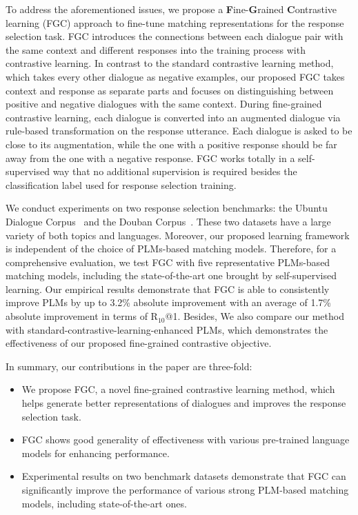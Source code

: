 \documentclass[letterpaper]{article} \usepackage{aaai22}  \usepackage{times}  \usepackage{helvet}  \usepackage{courier}  \usepackage[hyphens]{url}  \usepackage{graphicx} \urlstyle{rm} \def\UrlFont{\rm}  \usepackage{natbib}  \usepackage{caption} \DeclareCaptionStyle{ruled}{labelfont=normalfont,labelsep=colon,strut=off} \frenchspacing  \setlength{\pdfpagewidth}{8.5in}  \setlength{\pdfpageheight}{11in}  \usepackage{algorithm}
\begin{document}
To address the aforementioned issues, we propose a \textbf{F}ine-\textbf{G}rained \textbf{C}ontrastive learning (FGC) approach to fine-tune matching representations for the response selection task. FGC introduces the connections between each dialogue pair with the same context and different responses into the training process with contrastive learning. In contrast to the standard contrastive learning method, which takes every other dialogue as negative examples, our proposed FGC takes context and response as separate parts and focuses on distinguishing between positive and negative dialogues with the same context. During fine-grained contrastive learning, each dialogue is converted into an augmented dialogue via rule-based transformation on the response utterance. Each dialogue is asked to be close to its augmentation, while the one with a positive response should be far away from the one with a negative response. FGC works totally in a self-supervised way that no additional supervision is required besides the classification label used for response selection training.

We conduct experiments on two response selection benchmarks: the Ubuntu Dialogue Corpus~\cite{lowe2015ubuntu} and the Douban Corpus~\cite{wu2016sequential}. These two datasets have a large variety of both topics and languages. Moreover, our proposed learning framework is independent of the choice of PLMs-based matching models. Therefore, for a comprehensive evaluation, we test FGC with five representative PLMs-based matching models, including the state-of-the-art one brought by self-supervised learning. Our empirical results demonstrate that FGC is able to consistently improve PLMs by up to 3.2\% absolute improvement with an average of 1.7\% absolute improvement in terms of R$_{10}$@1. Besides, We also compare our method with standard-contrastive-learning-enhanced PLMs, which demonstrates the effectiveness of our proposed fine-grained contrastive objective. 


In summary, our contributions in the paper are three-fold:
\begin{itemize}
    \item We propose FGC, a novel fine-grained contrastive learning method, which helps generate better representations of dialogues and improves the response selection task.
    \item FGC shows good generality of effectiveness with various pre-trained language models for enhancing performance.
    \item Experimental results on two benchmark datasets demonstrate that FGC can significantly improve the performance of various strong PLM-based matching models, including state-of-the-art ones.
\end{itemize}
\end{document}

